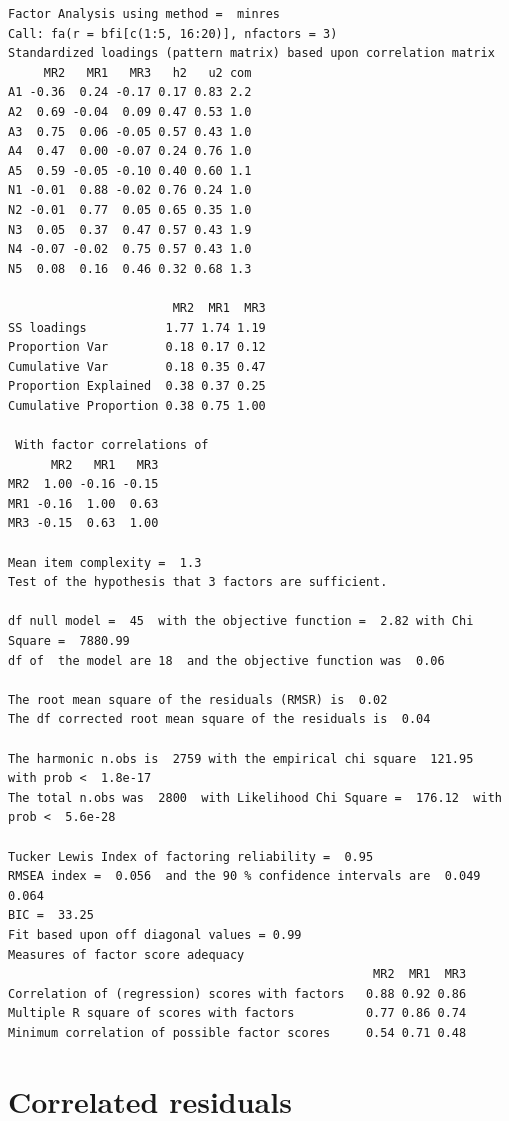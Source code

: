 \documentclass[
  letterpaper,
  DIV=11,
  numbers=noendperiod]{scrreprt}
\begin{document}
\begin{verbatim}
Factor Analysis using method =  minres
Call: fa(r = bfi[c(1:5, 16:20)], nfactors = 3)
Standardized loadings (pattern matrix) based upon correlation matrix
     MR2   MR1   MR3   h2   u2 com
A1 -0.36  0.24 -0.17 0.17 0.83 2.2
A2  0.69 -0.04  0.09 0.47 0.53 1.0
A3  0.75  0.06 -0.05 0.57 0.43 1.0
A4  0.47  0.00 -0.07 0.24 0.76 1.0
A5  0.59 -0.05 -0.10 0.40 0.60 1.1
N1 -0.01  0.88 -0.02 0.76 0.24 1.0
N2 -0.01  0.77  0.05 0.65 0.35 1.0
N3  0.05  0.37  0.47 0.57 0.43 1.9
N4 -0.07 -0.02  0.75 0.57 0.43 1.0
N5  0.08  0.16  0.46 0.32 0.68 1.3

                       MR2  MR1  MR3
SS loadings           1.77 1.74 1.19
Proportion Var        0.18 0.17 0.12
Cumulative Var        0.18 0.35 0.47
Proportion Explained  0.38 0.37 0.25
Cumulative Proportion 0.38 0.75 1.00

 With factor correlations of 
      MR2   MR1   MR3
MR2  1.00 -0.16 -0.15
MR1 -0.16  1.00  0.63
MR3 -0.15  0.63  1.00

Mean item complexity =  1.3
Test of the hypothesis that 3 factors are sufficient.

df null model =  45  with the objective function =  2.82 with Chi Square =  7880.99
df of  the model are 18  and the objective function was  0.06 

The root mean square of the residuals (RMSR) is  0.02 
The df corrected root mean square of the residuals is  0.04 

The harmonic n.obs is  2759 with the empirical chi square  121.95  with prob <  1.8e-17 
The total n.obs was  2800  with Likelihood Chi Square =  176.12  with prob <  5.6e-28 

Tucker Lewis Index of factoring reliability =  0.95
RMSEA index =  0.056  and the 90 % confidence intervals are  0.049 0.064
BIC =  33.25
Fit based upon off diagonal values = 0.99
Measures of factor score adequacy             
                                                   MR2  MR1  MR3
Correlation of (regression) scores with factors   0.88 0.92 0.86
Multiple R square of scores with factors          0.77 0.86 0.74
Minimum correlation of possible factor scores     0.54 0.71 0.48
\end{verbatim}


\chapter{Correlated residuals}\label{correlated-residuals}
\end{document}
